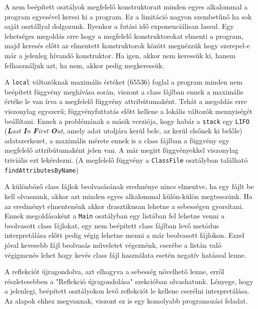 \begin{compactitem}
	\item A nem beépített osztályok megfelelő konstruktorait minden egyes alkalommal a program egyesével keresi ki a program. Ez a limitáció nagyon szembetűnő ha sok saját osztállyal dolgozunk. Ilyenkor a futási idő exponenciálisan lassul. Egy lehetséges megoldás erre hogy a megfelelő konstruktorokat elmenti a program, majd keresés előtt az elmentett konstruktorok között megnézzük hogy szerepel-e már a jelenleg hívandó konstruktor. Ha igen, akkor nem keressük ki, hanem felhasználjuk azt, ha nem, akkor pedig megkeressük.
	\item A \lstinline{local} változóknak maximális értéket ($65536$) foglal a program minden nem beépített függvény meghívása során, viszont a class fájlban ennek a maximális értéke le van írva a megfelelő függvény attribútumaként. Tehát a megoldás erre viszonylag egyszerű; függvényfuttatás előtt kellene a lokális változók mennyiségét beállítani. Ennek a problémának a másik verziója, hogy habár a \lstinline{stack} egy \lstinline{LIFO} (\textit{\textbf{L}ast \textbf{I}n \textbf{F}irst \textbf{O}ut}, amely adat utoljára kerül bele, az kerül elsőnek ki belőle) adatszerkezet, a maximális mérete ennek is a class fájlban a függvény egy megfelelő attribútumaként jelen van. A már megírt függvényekkel viszonylag triviális ezt lekérdezni. (A megfelelő függvény a \lstinline{ClassFile} osztályban található \lstinline{findAttributesByName})
	\item A különböző class fájlok beolvasásának eredménye nincs elmentve, ha egy fájlt be kell olvasnunk, akkor azt minden egyes alkalommal külön-külön megtesszünk. Ha az eredményt elmentenénk akkor drasztikusan lehetne a sebességen gyorsítani. Ennek megoldásaként a \lstinline{Main} osztályban egy listában fel lehetne venni a beolvasott class fájlokat, egy nem beépített class fájlban levő metódus interpretálása előtt pedig végig lehetne menni a már beolvasott fájlokon. Ezzel jóval kevesebb fájl beolvasás műveletet végeznénk, cserébe a listán való végigmenés lehet hogy kevés class fájl használata esetén negatív hatással lenne.
	\item A reflekciót újragondolva, azt elhagyva a sebesség növelhető lenne, erről részletesebben a "Reflekció újragondolása" szekcióban olvashatunk. Lényege, hogy a jelenlegi, beépített osztályokon levő reflekciót le kellene cserélni interpretálása. Az alapok ehhez megvannak, viszont ez is egy komolyabb programozási feladat.
\end{compactitem}

